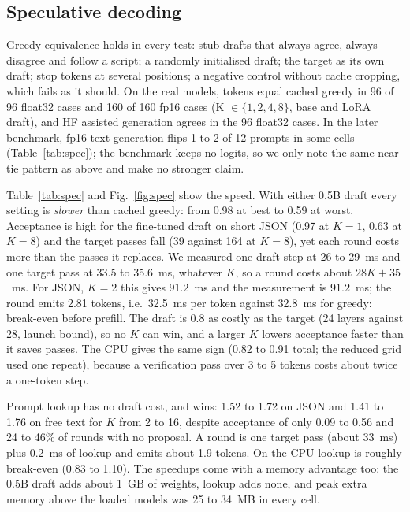 \documentclass[conference]{IEEEtran}
\begin{document}
\subsection{Speculative decoding}
Greedy equivalence holds in every test: stub drafts that always agree, always disagree and follow a script; a randomly initialised draft; the target as its own draft; stop tokens at several positions; a negative control without cache cropping, which fails as it should. On the real models, tokens equal cached greedy in 96 of 96 float32 cases and 160 of 160 fp16 cases (K $\in\{1,2,4,8\}$, base and LoRA draft), and HF assisted generation agrees in the 96 float32 cases. In the later benchmark, fp16 text generation flips 1 to 2 of 12 prompts in some cells (Table~\ref{tab:spec}); the benchmark keeps no logits, so we only note the same near-tie pattern as above and make no stronger claim.

Table~\ref{tab:spec} and Fig.~\ref{fig:spec} show the speed. With either 0.5B draft every setting is \emph{slower} than cached greedy: from 0.98 at best to 0.59 at worst. Acceptance is high for the fine-tuned draft on short JSON (0.97 at $K=1$, 0.63 at $K=8$) and the target passes fall (39 against 164 at $K=8$), yet each round costs more than the passes it replaces. We measured one draft step at 26 to 29~ms and one target pass at 33.5 to 35.6~ms, whatever $K$, so a round costs about $28K+35$~ms. For JSON, $K=2$ this gives $91.2$~ms and the measurement is $91.2$~ms; the round emits 2.81 tokens, i.e.\ 32.5~ms per token against 32.8~ms for greedy: break-even before prefill. The draft is 0.8 as costly as the target (24 layers against 28, launch bound), so no $K$ can win, and a larger $K$ lowers acceptance faster than it saves passes. The CPU gives the same sign (0.82 to 0.91 total; the reduced grid used one repeat), because a verification pass over 3 to 5 tokens costs about twice a one-token step.

Prompt lookup has no draft cost, and wins: 1.52 to 1.72 on JSON and 1.41 to 1.76 on free text for $K$ from 2 to 16, despite acceptance of only 0.09 to 0.56 and 24 to 46\% of rounds with no proposal. A round is one target pass (about 33~ms) plus 0.2~ms of lookup and emits about 1.9 tokens. On the CPU lookup is roughly break-even (0.83 to 1.10). The speedups come with a memory advantage too: the 0.5B draft adds about 1~GB of weights, lookup adds none, and peak extra memory above the loaded models was 25 to 34~MB in every cell.

\begin{table}[t]
\centering\small
\caption{Speculative decoding on the T4 (fp16, 12 validation rows, median of 3 repeats). Speedup is greedy cached total time over speculative total time.}
\label{tab:spec}
\resizebox{\columnwidth}{!}{}
\end{table}
\end{document}
